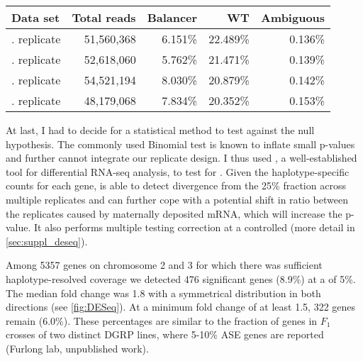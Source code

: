 \begin{table}[ht]
    \centering
    \begin{tabu}{lrrrr}
        \toprule
        Data set   & Total reads   & Balancer   & WT   & Ambiguous \\
        \midrule
        . replicate & 51,560,368  & 6.151\% & 22.489\%  & 0.136\% \\
        . replicate & 52,618,060  & 5.762\% & 21.471\%  & 0.139\% \\
        . replicate & 54,521,194  & 8.030\% & 20.879\%  & 0.142\% \\
        . replicate & 48,179,068  & 7.834\% & 20.352\%  & 0.153\% \\
        \bottomrule
    \end{tabu}
\end{table}

At last, I had to decide for a statistical method to test against the null
hypothesis. The commonly used Binomial test is known to inflate small p-values
\citep{Harvey2014} and further cannot integrate our replicate design. I thus
used \deseq, a well-established tool for differential RNA-seq analysis, to test
for \ase. Given the haplotype-specific counts for each gene, \deseq is able to
detect divergence from the 25\% fraction across multiple replicates and can
further cope with a potential shift in \ase ratio between the replicates caused
by maternally deposited mRNA, which will increase the p-value. It also performs
multiple testing correction at a controlled \fdr (more detail in
\cref{sec:suppl_deseq}).


Among 5357 genes on chromosome 2 and 3 for which there was sufficient
haplotype-resolved coverage we detected 476 significant \ase genes (8.9\%) at a
\fdr of 5\%. The median fold change was 1.8 with a symmetrical distribution in
both directions (see \cref{fig:DESeq}). At a minimum fold change of at least
1.5, 322 genes remain (6.0\%). These percentages are similar to the fraction of
\ase genes in $F_1$ crosses of two distinct DGRP lines, where 5-10\% ASE genes
are reported (Furlong lab, unpublished work).






